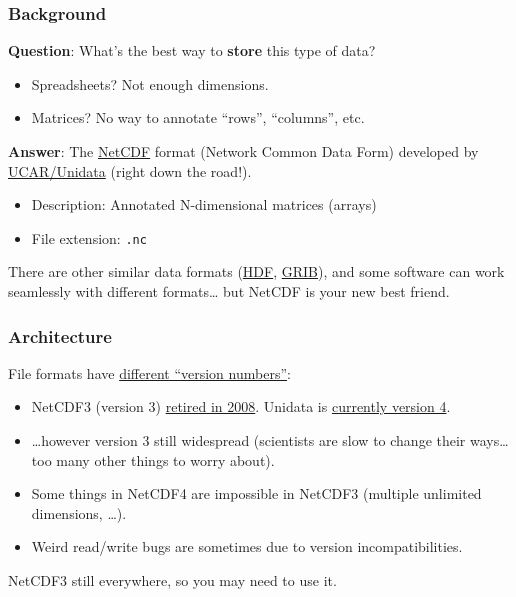 \documentclass[aspectratio=169]{beamer}
\begin{document}
\begin{frame}
  \frametitle{Background}

  \textbf{Question}:
  What's the best way to \textbf{store} this type of data?
  \begin{itemize}
    \item Spreadsheets? Not enough dimensions.
    \item Matrices? No way to annotate ``rows'', ``columns'', etc.
  \end{itemize}

  \textbf{Answer}:
  The \href{https://en.wikipedia.org/wiki/NetCDF}{NetCDF} format (Network Common Data Form)
  developed by \href{https://www.unidata.ucar.edu/software/netcdf/}{UCAR/Unidata}
  (right down the road!).
  \begin{itemize}
    \item
      Description: {\color{red}Annotated} N-dimensional matrices (arrays)
    \item
      File extension: \texttt{.nc}
  \end{itemize}

  There are other similar data formats
  (\href{https://en.wikipedia.org/wiki/Hierarchical_Data_Format}{HDF},
  \href{https://en.wikipedia.org/wiki/GRIB}{GRIB}),
  and some software can work seamlessly with different formats\ldots
  but {\color{red}NetCDF is your new best friend}.

\end{frame}


\begin{frame}
  \frametitle{Architecture}

  File formats have
  \href{https://www.unidata.ucar.edu/software/netcdf/docs/faq.html#whatisenhanceddatamodel}{different ``version numbers''}:
  \begin{itemize}
    \item
      NetCDF3 (version 3)
      \href{https://www.unidata.ucar.edu/software/netcdf/docs/RELEASE_NOTES.html#autotoc_md60}{retired in 2008}.
      Unidata is \href{https://www.unidata.ucar.edu/software/netcdf/docs/RELEASE_NOTES.html#autotoc_md0}{currently version 4}.
    \item
      \ldots however version 3 still widespread
      (scientists are slow to change their ways\ldots too many other things to worry about).
    \item
      Some things 
      in NetCDF4 are impossible in NetCDF3
      (multiple unlimited dimensions, \ldots).
    \item
      Weird read/write bugs are sometimes due to version incompatibilities.
  \end{itemize}

  NetCDF3 still everywhere, so you may need to use it.
\end{frame}
\end{document}
